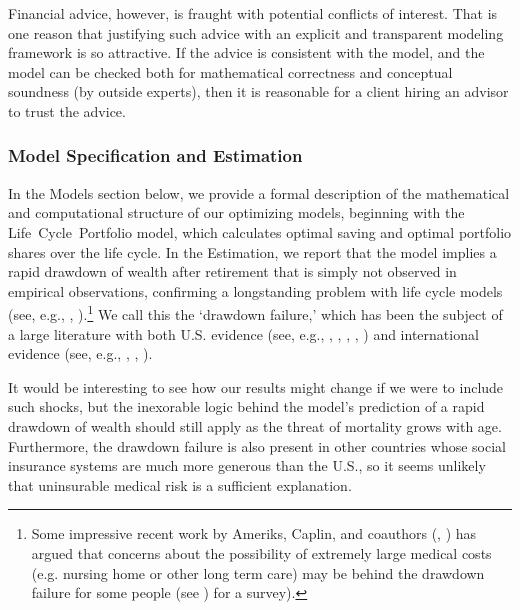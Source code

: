 \documentclass{article}
\begin{document}
Financial advice, however, is fraught with potential conflicts of interest.
That is one reason that justifying such advice with an explicit and transparent modeling framework is so attractive.
If the advice is consistent with the model, and the model can be checked both for mathematical correctness and conceptual soundness (by outside experts), then it is reasonable for a client hiring an advisor to trust the advice.

\subsubsection{Model Specification and Estimation}

In the Models section below, we provide a formal description of the mathematical and computational structure of our optimizing models, beginning with the Life~Cycle~Portfolio model, which calculates optimal saving and optimal portfolio shares over the life cycle.
In the Estimation, we report that the model implies a rapid drawdown of wealth after retirement that is simply not observed in empirical observations, confirming a longstanding problem with life cycle models (see, e.g., \cite{hurd1987savings}, \cite{HEIMER_2019}).\footnote{Some impressive recent work by Ameriks, Caplin, and coauthors (\cite{ameriks2011joy}, \cite{Ameriks2020jpe}) has argued that concerns about the possibility of extremely large medical costs (e.g. nursing home or other long term care) may be behind the drawdown failure for some people (see \cite{DeNardi2016d}) for a survey).}
We call this the `drawdown failure,' which has been the subject of a large literature with both U.S. evidence (see, e.g., \cite{Hurd_1989}, \cite{DeNardi2016d}, \cite{Kopecky_2014}, \cite{Mortenson_2019}, \cite{Poterba_2018}) and international evidence (see, e.g., \cite{Christensen_2022}, \cite{Ventura_2020}, \cite{Niimi_2019}).


It would be interesting to see how our results might change if we were to include such shocks, but the inexorable logic behind the model's prediction of a rapid drawdown of wealth should still apply as the threat of mortality grows with age.
Furthermore, the drawdown failure is also present in other countries whose social insurance systems are much more generous than the U.S., so it seems unlikely that uninsurable medical risk is a sufficient explanation.
\end{document}

